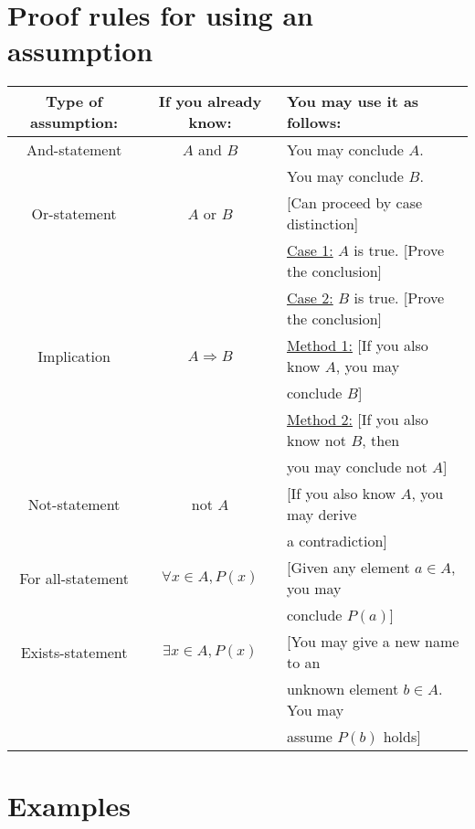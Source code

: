 \documentclass[11pt]{article}
\begin{document}
    \pagebreak

    \section{Proof rules for using an assumption}
    \begin{center}
        \begin{tabular}{c c l}
            Type of assumption: & If you already know: & You may use it as follows: \\ \hline
            And-statement & $A$ and $B$ & You may conclude $A$. \\
            && You may conclude $B$. \\ \hline
            Or-statement & $A$ or $B$ & [Can proceed by case distinction] \\ 
            && \underline{Case 1:} $A$ is true. [Prove the conclusion] \\
            && \underline{Case 2:} $B$ is true. [Prove the conclusion] \\ \hline
            Implication & \(A \Rightarrow B\) & \underline{Method 1:} [If you also know $A$, you may \\
            && conclude $B$] \\
            && \underline{Method 2:} [If you also know not $B$, then \\
            && you may conclude not $A$] \\ \hline
            Not-statement & not $A$ & [If you also know $A$, you may derive \\
            && a contradiction] \\ \hline
            For all-statement & \(\forall x \in A, P(x)\) & [Given any element \(a \in A\), you may \\
            && conclude \(P(a)\)] \\ \hline
            Exists-statement & \(\exists x \in A, P(x)\) & [You may give a new name to an \\
            && unknown element \(b \in A\). You may \\
            && assume \(P(b)\) holds]
        \end{tabular}
    \end{center}

    \section{Examples}
\end{document}

